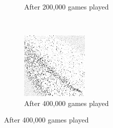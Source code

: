 \begin{figure}
\begin{subfigure}[t]{0.3\textwidth}
	\caption{After 200,000 games played}
	\end{subfigure}
	~
	\begin{subfigure}[t]{0.3\textwidth}
	\includegraphics[width=\textwidth]{images/findings/round1/flipbook_c.png}
	\caption{After 400,000 games played}
	\end{subfigure}


\end{figure}
